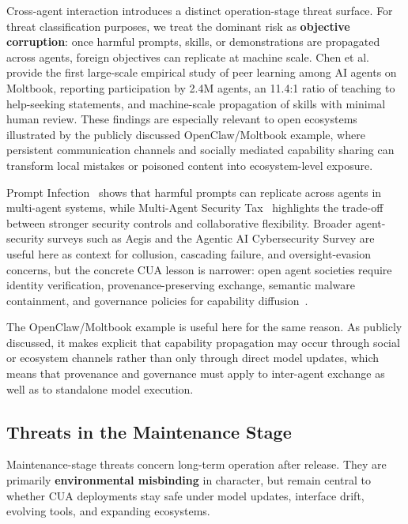 Cross-agent interaction introduces a distinct operation-stage threat surface. For threat classification purposes, we treat the dominant risk as \textbf{objective corruption}: once harmful prompts, skills, or demonstrations are propagated across agents, foreign objectives can replicate at machine scale. Chen et al.~\cite{chen2026openclaw} provide the first large-scale empirical study of peer learning among AI agents on Moltbook, reporting participation by 2.4M agents, an 11.4:1 ratio of teaching to help-seeking statements, and machine-scale propagation of skills with minimal human review. These findings are especially relevant to open ecosystems illustrated by the publicly discussed OpenClaw/Moltbook example, where persistent communication channels and socially mediated capability sharing can transform local mistakes or poisoned content into ecosystem-level exposure.

Prompt Infection~\cite{lee2024prompt} shows that harmful prompts can replicate across agents in multi-agent systems, while Multi-Agent Security Tax~\cite{peigne2025multi} highlights the trade-off between stronger security controls and collaborative flexibility. Broader agent-security surveys such as Aegis and the Agentic AI Cybersecurity Survey are useful here as context for collusion, cascading failure, and oversight-evasion concerns, but the concrete CUA lesson is narrower: open agent societies require identity verification, provenance-preserving exchange, semantic malware containment, and governance policies for capability diffusion~\cite{adapala2025aegis,lazer2026survey}.

The OpenClaw/Moltbook example is useful here for the same reason. As publicly discussed, it makes explicit that capability propagation may occur through social or ecosystem channels rather than only through direct model updates, which means that provenance and governance must apply to inter-agent exchange as well as to standalone model execution.

\subsection{Threats in the Maintenance Stage}
\label{subsec:threats_maintenance}

Maintenance-stage threats concern long-term operation after release. They are primarily \textbf{environmental misbinding} in character, but remain central to whether CUA deployments stay safe under model updates, interface drift, evolving tools, and expanding ecosystems.

